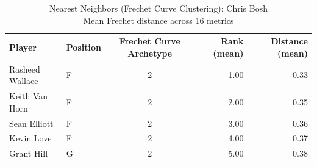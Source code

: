 \begin{table}[t]
\caption*{
{\fontsize{20}{25} Nearest Neighbors (Frechet Curve Clustering): Chris Bosh\fontsize{12}{15}\selectfont } \\ 
{\fontsize{14}{17}\selectfont  Mean Frechet distance across 16 metrics\fontsize{12}{15}\selectfont }
} 
\fontsize{12.0pt}{14.0pt}\selectfont
\begin{tabular*}{\linewidth}{@{\extracolsep{\fill}}llcrr}
\toprule
Player & Position & Frechet Curve Archetype & Rank (mean) & Distance (mean) \\ 
\midrule\addlinespace[2.5pt]
Rasheed Wallace & F & 2 & 1.00 & 0.33 \\ 
Keith Van Horn & F & 2 & 2.00 & 0.35 \\ 
Sean Elliott & F & 2 & 3.00 & 0.36 \\ 
Kevin Love & F & 2 & 4.00 & 0.37 \\ 
Grant Hill & G & 2 & 5.00 & 0.38 \\ 
\bottomrule
\end{tabular*}
\end{table}

